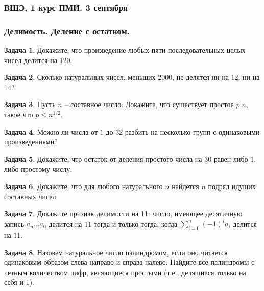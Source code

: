 \documentclass[12pt, fleqn]{extarticle}
\theoremstyle{definition}
\newtheorem{problem}{Задача}
\theoremstyle{remark}
\begin{document}
\clearpage
\thispagestyle{empty}
\subsubsection*{ВШЭ, 1 курс ПМИ. 3 сентября}

\subsubsection*{Делимость. Деление с остатком.}

\begin{problem}
Докажите, что произведение любых пяти последовательных целых чисел
делится на 120.
\end{problem}

\begin{problem}
Сколько натуральных чисел, меньших 2000, не делятся ни на 12, ни на 14?
\end{problem}

\begin{problem}
Пусть $n$ -- составное число. 
Докажите, что существует простое $p|n$, такое что $p \leq n^{1/2}$.
\end{problem}

\begin{problem}
Можно ли числа от $1$ до $32$ разбить на несколько групп с одинаковыми произведениями?
\end{problem}

\begin{problem}
Докажите, что остаток от деления простого числа на 30 
равен либо $1$, либо простому числу.
\end{problem}

\begin{problem}
Докажите, что для любого натурального $n$ 
найдется $n$ подряд идущих составных чисел.
\end{problem}

\begin{problem}
Докажите признак делимости на 11: 
число, имеющее десятичную запись $a_n\dots a_0$ 
делится на 11 тогда и только тогда, когда $\sum\limits_{i=0}^n (-1)^ia_i$ 
делится на 11.
\end{problem}


\begin{problem}
Назовем натуральное число палиндромом, если оно читается одинаковым образом слева направо и справа налево. 
Найдите все палиндромы с четным количеством цифр, являющиеся простыми (т.е., делящиеся только на себя и 1).
\end{problem}
\end{document}

